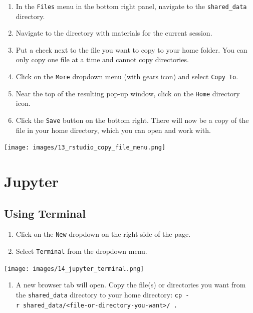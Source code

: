 \documentclass[]{book}
\providecommand{\tightlist}{%
  \setlength{\itemsep}{0pt}\setlength{\parskip}{0pt}}
\begin{document}
\begin{enumerate}
\def\labelenumi{\arabic{enumi}.}
\tightlist
\item
  In the \texttt{Files} menu in the bottom right panel, navigate to the \texttt{shared\_data} directory.
\item
  Navigate to the directory with materials for the current session.
\item
  Put a check next to the file you want to copy to your home folder. You can only copy one file at a time and cannot copy directories.
\item
  Click on the \texttt{More} dropdown menu (with gears icon) and select \texttt{Copy\ To}.
\item
  Near the top of the resulting pop-up window, click on the \texttt{Home} directory icon.
\item
  Click the \texttt{Save} button on the bottom right. There will now be a copy of the file in your home directory, which you can open and work with.
\end{enumerate}

\texttt{[image: images/13\_rstudio\_copy\_file\_menu.png]}

\hypertarget{jupyter-2}{%
\section{Jupyter}\label{jupyter-2}}

\hypertarget{using-terminal-1}{%
\subsection{Using Terminal}\label{using-terminal-1}}

\begin{enumerate}
\def\labelenumi{\arabic{enumi}.}
\tightlist
\item
  Click on the \texttt{New} dropdown on the right side of the page.
\item
  Select \texttt{Terminal} from the dropdown menu.
\end{enumerate}

\texttt{[image: images/14\_jupyter\_terminal.png]}

\begin{enumerate}
\def\labelenumi{\arabic{enumi}.}
\setcounter{enumi}{2}
\tightlist
\item
  A new browser tab will open. Copy the file(s) or directories you want from the \texttt{shared\_data} directory to your home directory: \texttt{cp\ -r\ shared\_data/\textless{}file-or-directory-you-want\textgreater{}/\ .}
\end{enumerate}
\end{document}
